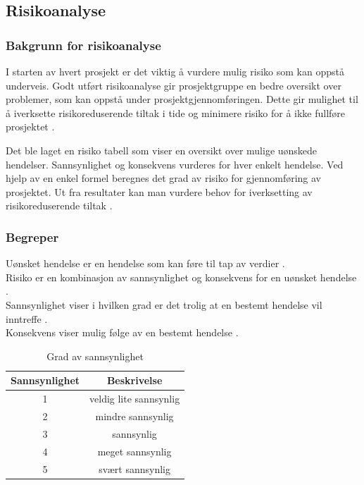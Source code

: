 \newpage
\subsection{Risikoanalyse}

\subsubsection{Bakgrunn for risikoanalyse}

I starten av hvert prosjekt er det viktig å vurdere mulig risiko som kan oppstå underveis. Godt utført risikoanalyse gir prosjektgruppe en bedre oversikt over problemer, som kan oppstå under prosjektgjennomføringen. Dette gir mulighet til å iverksette risikoreduserende tiltak i tide og minimere risiko for å ikke fullføre prosjektet \cite{4-forelesning-risikonalyse}.

Det ble laget en risiko tabell som viser en oversikt over mulige uønskede hendelser. Sannsynlighet og konsekvens vurderes for hver enkelt hendelse. Ved hjelp av en enkel formel beregnes det grad av risiko for gjennomføring av prosjektet. Ut fra resultater kan man vurdere behov for iverksetting av risikoreduserende tiltak \cite{4-forelesning-risikonalyse}.    

\subsubsection*{Begreper}

Uønsket hendelse er en hendelse som kan føre til tap av verdier \cite{4-norsk-standard}.\\  
Risiko er en kombinasjon av sannsynlighet og konsekvens for en uønsket hendelse \cite{4-norsk-standard}.\\
Sannsynlighet viser i hvilken grad er det trolig at en bestemt hendelse vil inntreffe \cite{4-norsk-standard}.\\  
Konsekvens viser mulig følge av en bestemt hendelse \cite{4-norsk-standard}.
 
\begin{table}[H]
\centering
\begin{tabular}{|c|c|} 
\hline
Sannsynlighet & Beskrivelse\\
\hline\hline
1 & veldig lite sannsynlig\\
\hline
2 & mindre sannsynlig\\
\hline
3 & sannsynlig\\
\hline
4 & meget sannsynlig\\
\hline
5 & svært sannsynlig\\
\hline
\end{tabular}
\caption{Grad av sannsynlighet \cite{4-forelesning-risikonalyse}}
\label{table1}
\end{table}

